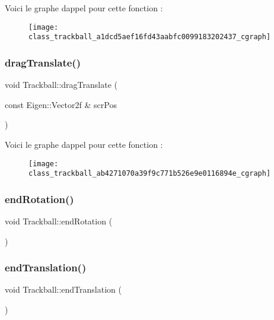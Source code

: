 Voici le graphe d\textquotesingle{}appel pour cette fonction \+:
\nopagebreak
\begin{figure}[H]
\begin{center}
\leavevmode
\texttt{[image: class\_trackball\_a1dcd5aef16fd43aabfc0099183202437\_cgraph]}
\end{center}
\end{figure}
\mbox{\label{class_trackball_ab4271070a39f9c771b526e9e0116894e}} 
\subsubsection{\texorpdfstring{drag\+Translate()}{dragTranslate()}}
{\footnotesize\ttfamily void Trackball\+::drag\+Translate (\begin{DoxyParamCaption}\item[{const Eigen\+::\+Vector2f \&}]{scr\+Pos }\end{DoxyParamCaption})}

Voici le graphe d\textquotesingle{}appel pour cette fonction \+:
\nopagebreak
\begin{figure}[H]
\begin{center}
\leavevmode
\texttt{[image: class\_trackball\_ab4271070a39f9c771b526e9e0116894e\_cgraph]}
\end{center}
\end{figure}
\mbox{\label{class_trackball_a1d2f2f29955059d93bb64fe5f83b0afc}} 
\subsubsection{\texorpdfstring{end\+Rotation()}{endRotation()}}
{\footnotesize\ttfamily void Trackball\+::end\+Rotation (\begin{DoxyParamCaption}{ }\end{DoxyParamCaption})}

\mbox{\label{class_trackball_ae8ba33700d707ed2621f39bc8fbd3686}} 
\subsubsection{\texorpdfstring{end\+Translation()}{endTranslation()}}
{\footnotesize\ttfamily void Trackball\+::end\+Translation (\begin{DoxyParamCaption}{ }\end{DoxyParamCaption})}

